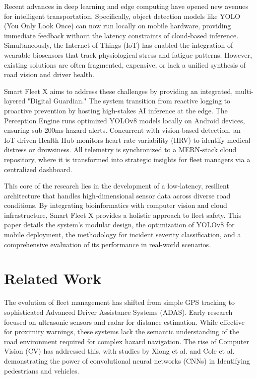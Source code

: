 \documentclass[conference]{IEEEtran}
\begin{document}
Recent advances in deep learning and edge computing have opened new avenues for intelligent transportation. Specifically, object detection models like YOLO (You Only Look Once) can now run locally on mobile hardware, providing immediate feedback without the latency constraints of cloud-based inference. Simultaneously, the Internet of Things (IoT) has enabled the integration of wearable biosensors that track physiological stress and fatigue patterns. However, existing solutions are often fragmented, expensive, or lack a unified synthesis of road vision and driver health.

Smart Fleet X aims to address these challenges by providing an integrated, multi-layered "Digital Guardian." The system transition from reactive logging to proactive prevention by hosting high-stakes AI inference at the edge. The Perception Engine runs optimized YOLOv8 models locally on Android devices, ensuring sub-200ms hazard alerts. Concurrent with vision-based detection, an IoT-driven Health Hub monitors heart rate variability (HRV) to identify medical distress or drowsiness. All telemetry is synchronized to a MERN-stack cloud repository, where it is transformed into strategic insights for fleet managers via a centralized dashboard.

This core of the research lies in the development of a low-latency, resilient architecture that handles high-dimensional sensor data across diverse road conditions. By integrating bioinformatics with computer vision and cloud infrastructure, Smart Fleet X provides a holistic approach to fleet safety. This paper details the system's modular design, the optimization of YOLOv8 for mobile deployment, the methodology for incident severity classification, and a comprehensive evaluation of its performance in real-world scenarios.

\section{Related Work}
The evolution of fleet management has shifted from simple GPS tracking to sophisticated Advanced Driver Assistance Systems (ADAS). Early research focused on ultrasonic sensors and radar for distance estimation. While effective for proximity warnings, these systems lack the semantic understanding of the road environment required for complex hazard navigation. The rise of Computer Vision (CV) has addressed this, with studies by Xiong et al. and Cole et al. demonstrating the power of convolutional neural networks (CNNs) in Identifying pedestrians and vehicles.
\end{document}
